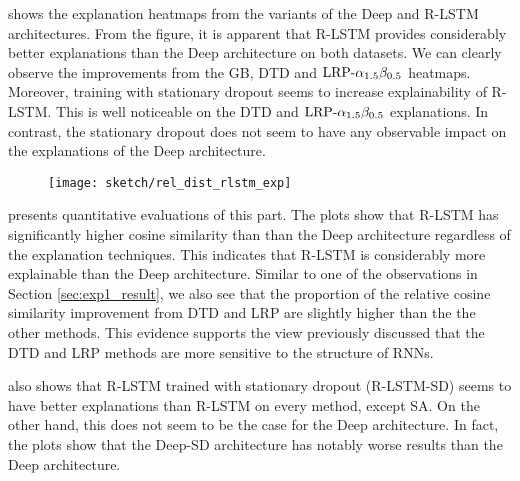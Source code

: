 \addfigure{\ref{fig:heatmap_msc_rlstm_exp}} shows the explanation heatmaps from the variants of the Deep and R-LSTM architectures. From the figure, it is apparent that R-LSTM provides considerably better explanations than the Deep architecture on both datasets. We can clearly observe the improvements from the GB, DTD and $\text{LRP-}\alpha_{1.5}\beta_{0.5}$ heatmaps. Moreover, training with stationary dropout seems to increase explainability of  R-LSTM. This is well noticeable on the DTD and $\text{LRP-}\alpha_{1.5}\beta_{0.5}$ explanations. In contrast, the stationary dropout does not seem to have any observable  impact on the explanations of the Deep architecture.


 \begin{figure}[!htb]
\centering
\texttt{[image: sketch/rel\_dist\_rlstm\_exp]}

\label{fig:rel_dist_rlstm_exp}
\end{figure}

\addfigure{\ref{fig:rel_dist_rlstm_exp}} presents quantitative evaluations of this part. The plots show that  R-LSTM has significantly higher cosine similarity than than the Deep architecture regardless of the explanation techniques.  This indicates that R-LSTM is considerably  more explainable than the Deep architecture. Similar to one of the observations in Section \ref{sec:exp1_result}, we also see that the proportion of  the relative cosine similarity improvement from DTD and LRP are slightly higher than the the other methods. This evidence supports the view previously discussed that the DTD and LRP methods are more sensitive to the structure of RNNs.

\addfigure{\ref{fig:rel_dist_rlstm_exp}}  also shows that  R-LSTM trained with stationary dropout (R-LSTM-SD) seems to have better explanations than R-LSTM on every method, except SA. On the other hand, this does not seem to be the case for the Deep architecture. In fact, the plots show that the Deep-SD architecture has notably worse results than the Deep architecture.



